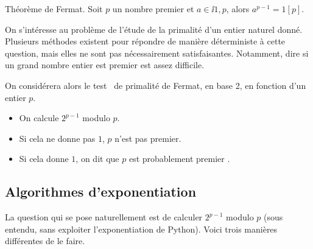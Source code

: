 \begin{theorem}{Théorème de Fermat.}
  Soit $p$ un nombre premier et $a \in \ii{1,p}$, alors $a^{p-1} = 1 [p]$.
\end{theorem}

On s'intéresse au problème de l'étude de la primalité d'un entier naturel donné. 
Plusieurs méthodes existent pour répondre de manière déterministe à cette question, mais elles ne sont pas nécessairement satisfaisantes. 
Notamment, dire si un grand nombre entier est premier est assez difficile. 

On considérera alors le \og test \fg\ de primalité de Fermat, en base 2, en fonction d'un entier $p$.
\begin{itemize}
  \item On calcule $2^{p-1}$ modulo $p$. 
  \item Si cela ne donne pas $1$, $p$ n'est pas premier. 
  \item Si cela donne $1$, on dit que \og $p$ est probablement premier \fg.
\end{itemize}

\subsection{Algorithmes d'exponentiation}

La question qui se pose naturellement est de calculer $2^{p-1}$ modulo $p$ (sous entendu, sans exploiter l'exponentiation de Python). Voici trois manières différentes de le faire. 

